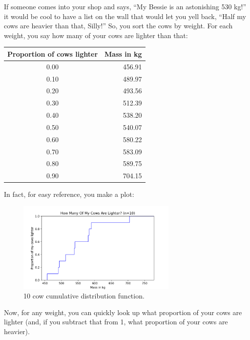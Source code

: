 If someone comes into your shop and says, ``My Bessie is an astonishing 530 kg!'' it would be cool to have a list on the wall that would let you yell back, ``Half my cows are heavier than that, Silly!''  So, you sort the cows by weight. For each weight,  you say how many of your cows are lighter than that:

\begin{tabular}{c|r}
Proportion of cows lighter & Mass in kg \\
\hline
0.00 & 456.91 \\
0.10 & 489.97 \\
0.20 & 493.56 \\
0.30 & 512.39 \\
0.40 & 538.20 \\
0.50 & 540.07 \\
0.60 & 580.22 \\
0.70 & 583.09 \\
0.80 & 589.75 \\
0.90 & 704.15 \\
\end{tabular}

In fact, for easy reference,  you make a plot:
\begin{figure}[htbp]
    \centering
    \includegraphics[width=0.7\textwidth]{cow_sample_cdf.png}
    \caption{10 cow cumulative distribution function.}
    \label{fig:10cdf}
\end{figure}

Now, for any weight, you can quickly look up what proportion of your cows are lighter (and, if you subtract that from 1,  what proportion of your cows are heavier).

